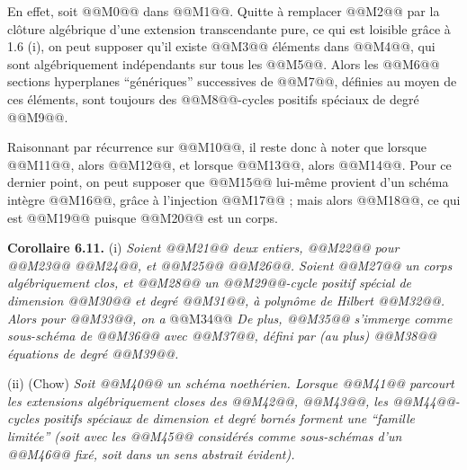 
En effet, soit @@M0@@ dans @@M1@@. Quitte \`a remplacer @@M2@@ par la cl\^oture alg\'ebrique d'une extension transcendante pure, ce qui est loisible gr\^ace \`a 1.6 (i), on peut supposer qu'il existe @@M3@@ \'el\'ements dans @@M4@@, qui sont alg\'ebriquement ind\'ependants sur tous les @@M5@@. Alors les @@M6@@ sections hyperplanes ``g\'en\'eriques'' successives de @@M7@@, d\'efinies au moyen de ces \'el\'ements, sont toujours des @@M8@@-cycles positifs sp\'eciaux de degr\'e @@M9@@.

Raisonnant par r\'ecurrence sur @@M10@@, il reste donc \`a noter que lorsque @@M11@@, alors @@M12@@, et lorsque @@M13@@, alors @@M14@@. Pour ce dernier point, on peut supposer que @@M15@@ lui-m\^eme provient d'un sch\'ema int\`egre @@M16@@, gr\^ace \`a l'injection @@M17@@ ; mais alors @@M18@@, ce qui est @@M19@@ puisque @@M20@@ est un corps.

\textbf{Corollaire 6.11.} (i) \emph{Soient @@M21@@ deux entiers, @@M22@@ pour @@M23@@ @@M24@@, et @@M25@@ @@M26@@. Soient @@M27@@ un corps alg\'ebriquement clos, et @@M28@@ un @@M29@@-cycle positif sp\'ecial de dimension @@M30@@ et degr\'e @@M31@@, \`a polyn\^ome de Hilbert @@M32@@. Alors pour @@M33@@, on a}
@@M34@@
\emph{De plus, @@M35@@ s'immerge comme sous-sch\'ema de @@M36@@ avec @@M37@@, d\'efini par (au plus) @@M38@@ \'equations de degr\'e @@M39@@.}

(ii) (Chow) \emph{Soit @@M40@@ un sch\'ema noeth\'erien. Lorsque @@M41@@ parcourt les extensions alg\'ebriquement closes des @@M42@@, @@M43@@, les @@M44@@-cycles positifs sp\'eciaux de dimension et degr\'e born\'es forment une ``famille limit\'ee'' (soit avec les @@M45@@ consid\'er\'es comme sous-sch\'emas d'un @@M46@@ fix\'e, soit dans un sens abstrait \'evident).}

